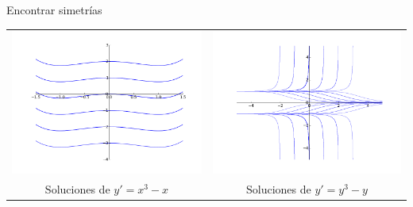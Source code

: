 \documentclass[handout,hyperref={colorlinks=true}]{beamer}
\begin{document}
\begin{frame}{Encontrar simetrías}

\begin{tabular}{cc}
\includegraphics[scale=.3]{imagenes/sol_paralelas.png} &\hspace{-1.5cm}\includegraphics[scale=.3]{imagenes/sol_paralelas2.png} \\
Soluciones de $y'=x^3-x$ &\hspace{-1.5cm}Soluciones de $y'=y^3-y$
\end{tabular}

\end{frame}
\end{document}

